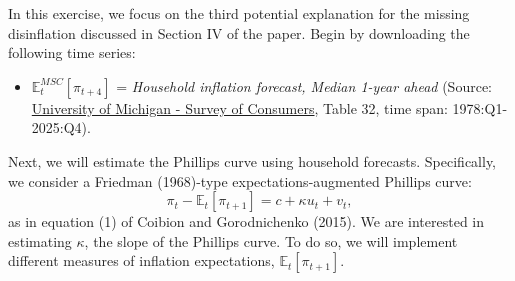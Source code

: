 \documentclass[dvipsnames,11pt]{article}
\begin{document}
        \noindent In this exercise, we focus on the third potential explanation for the missing disinflation discussed in Section IV of the paper. Begin by downloading the following time series: 
        \begin{itemize}
            \item[\(\Rightarrow\)] $\mathbb{E}^{MSC}_t[\pi_{t+4}]$ = \textit{Household inflation forecast, Median 1-year ahead} (Source: \href{https://data.sca.isr.umich.edu/data-archive/mine.php}{University of Michigan - Survey of Consumers}, Table 32, time span: 1978:Q1-2025:Q4).
        \end{itemize}

        \noindent Next, we will estimate the Phillips curve using household forecasts. Specifically, we consider a Friedman (1968)-type expectations-augmented Phillips curve:
        \begin{equation}\label{eq1} 
            \pi_t - \mathbb{E}_t[\pi_{t+1}] = c  + \kappa u_t + v_t,
        \end{equation}
        as in equation (1) of Coibion and Gorodnichenko (2015). We are interested in estimating $\kappa$, the slope of the Phillips curve. To do so, we will implement different measures of inflation expectations, $\mathbb{E}_t[\pi_{t+1}]$.
        
\end{document}
